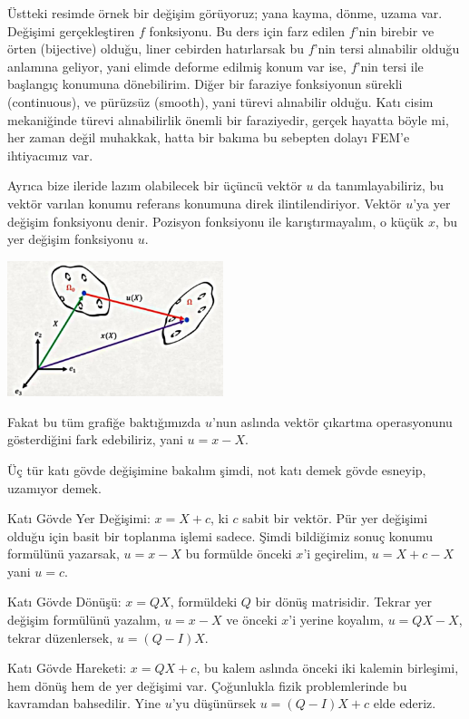 \documentclass[12pt,fleqn]{article}\usepackage{../../common}
\begin{document}
Üstteki resimde örnek bir değişim görüyoruz; yana kayma, dönme, uzama
var. Değişimi gerçekleştiren $f$ fonksiyonu. Bu ders için farz edilen $f$'nin
birebir ve örten (bijective) olduğu, liner cebirden hatırlarsak bu $f$'nin tersi
alınabilir olduğu anlamına geliyor, yani elimde deforme edilmiş konum var ise,
$f$'nin tersi ile başlangıç konumuna dönebilirim. Diğer bir faraziye fonksiyonun
sürekli (continuous), ve pürüzsüz (smooth), yani türevi alınabilir olduğu. Katı
cisim mekaniğinde türevi alınabilirlik önemli bir faraziyedir, gerçek hayatta
böyle mi, her zaman değil muhakkak, hatta bir bakıma bu sebepten dolayı FEM'e
ihtiyacımız var.

Ayrıca bize ileride lazım olabilecek bir üçüncü vektör $u$ da tanımlayabiliriz,
bu vektör varılan konumu referans konumuna direk ilintilendiriyor. Vektör $u$'ya
yer değişim fonksiyonu denir. Pozisyon fonksiyonu ile karıştırmayalım, o küçük
$x$, bu yer değişim fonksiyonu $u$.

\includegraphics[width=17em]{phy_020_strs_01_05.jpg}

Fakat bu tüm grafiğe baktığımızda $u$'nun aslında vektör çıkartma operasyonunu
gösterdiğini fark edebiliriz, yani $u = x - X$.

Üç tür katı gövde değişimine bakalım şimdi, not katı demek gövde esneyip,
uzamıyor demek.

Katı Gövde Yer Değişimi: $x = X + c$, ki $c$ sabit bir vektör. Pür yer değişimi
olduğu için basit bir toplanma işlemi sadece. Şimdi bildiğimiz sonuç konumu
formülünü yazarsak, $u = x - X$ bu formülde önceki $x$'i geçirelim, $u = X + c -
X$ yani $u = c$.

Katı Gövde Dönüşü: $x = Q X$, formüldeki $Q$ bir dönüş matrisidir. Tekrar yer
değişim formülünü yazalım, $u = x - X$ ve önceki $x$'i yerine koyalım, $u = QX -
X$, tekrar düzenlersek, $u = (Q-I)X$.

Katı Gövde Hareketi: $x = QX + c$, bu kalem aslında önceki iki kalemin
birleşimi, hem dönüş hem de yer değişimi var. Çoğunlukla fizik problemlerinde bu
kavramdan bahsedilir. Yine $u$'yu düşünürsek $u = (Q-I)X + c$ elde ederiz.
\end{document}
